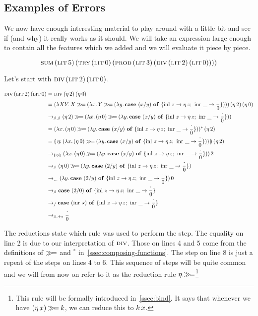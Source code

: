 \subsection{Examples of Errors}

We now have enough interesting material to play around with a little bit
and see if (and why) it really works as it should. We will take an
expression large enough to contain all the features which we added and we
will evaluate it piece by piece.

$$
\textsc{sum}\,(\textsc{lit}\,5)\,(\textsc{try}\,(\textsc{lit}\,0)\,(\textsc{prod}\,(\textsc{lit}\,3)\,(\textsc{div}\,(\textsc{lit}\,2)\,(\textsc{lit}\,0))))
$$

Let's start with $\textsc{div}\,(\textsc{lit}\,2)\,(\textsc{lit}\,0)$.

\NoChapterPrefix
\begin{align}
  \app{\dive}{\litec{2}}{\litec{0}}
  &= \app{\dive}{(\ap{\eta}{2})}
                {(\ap{\eta}{0})} \\
  &= \app{(\lam{X Y}{X \hsbind (\lam{x}{Y \hsbind (\lam{y}
          {\case{(x / y)}{z}{\ap{\eta}{z}}{\_}{\dbze}})})})}
                {(\ap{\eta}{2})} {(\ap{\eta}{0})} \\
  &\to_{\beta,\beta} (\ap{\eta}{2}) \hsbind (\lam{x}{(\ap{\eta}{0}) \hsbind (\lam{y}
          {\case{(x / y)}{z}{\ap{\eta}{z}}{\_}{\dbze}})}) \\
  &= \ap{(\lam{x}{(\ap{\eta}{0}) \hsbind (\lam{y}
          {\case{(x / y)}{z}{\ap{\eta}{z}}{\_}{\dbze}})})^*}{(\ap{\eta}{2})} \\
  &= \ap{\banana{\onto{\eta}{(\lam{x}{(\ap{\eta}{0}) \hsbind (\lam{y}
          {\case{(x / y)}{z}{\ap{\eta}{z}}{\_}{\dbze}})})}}}{(\ap{\eta}{2})} \\
  &\to_{\banana{\eta}} \ap{(\lam{x}{(\ap{\eta}{0}) \hsbind (\lam{y}
          {\case{(x / y)}{z}{\ap{\eta}{z}}{\_}{\dbze}})})}{2} \\
  &\to_{\beta} (\ap{\eta}{0}) \hsbind (\lam{y}
          {\case{(2 / y)}{z}{\ap{\eta}{z}}{\_}{\dbze}}) \\
  &\to_{\ldots} \ap{(\lam{y}{\case{(2 / y)}{z}{\ap{\eta}{z}}{\_}{\dbze}})}{0} \\
  &\to_{\beta} \case{(2 / 0)}{z}{\ap{\eta}{z}}{\_}{\dbze} \\
  &\to_{/} \case{(\ap{\inr}{\star})}{z}{\ap{\eta}{z}}{\_}{\dbze} \\
  &\to_{\beta.+_2} \dbze
\end{align}
\setcounter{equation}{0}
\ChapterPrefix

The reductions state which rule was used to perform the step. The equality
on line 2 is due to our interpretation of $\textsc{div}$. Those on lines 4 and 5
come from the definitions of $\mathbin{\gg\!=}$ and $^*$
in~\ref{ssec:composing-functions}. The step on line 8 is just a repeat of
the steps on lines 4 to 6. This sequence of steps will be quite common and
we will from now on refer to it as the reduction rule
$\eta.\mathbin{\gg\!=}$\footnote{This rule will be formally introduced
  in~\ref{ssec:bind}. It says that whenever we have
  $(\eta\,x) \mathbin{\gg\!=} k$, we can reduce this to $k\,x$.}


